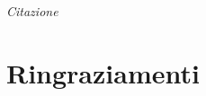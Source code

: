 
\begin{flushright}{\slshape    
    Citazione}
\end{flushright}



\bigskip

\begingroup
\let\clearpage\relax
\let\cleardoublepage\relax
\let\cleardoublepage\relax
\chapter*{Ringraziamenti}



\endgroup



